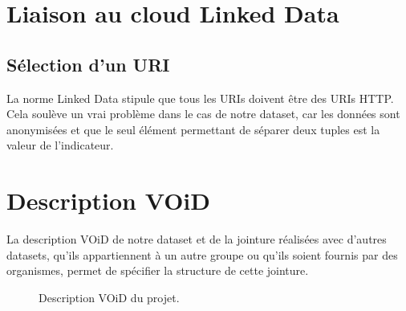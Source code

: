 \chapter{Liaison au cloud Linked Data}
\section{Sélection d'un URI}

La norme Linked Data stipule que tous les URIs doivent être des URIs HTTP. Cela soulève un vrai problème dans le cas de notre dataset, car les données sont anonymisées et que le seul élément permettant de séparer deux tuples est la valeur de l'indicateur.

\chapter{Description VOiD}

La description VOiD de notre dataset et de la jointure réalisées avec d'autres datasets, qu'ils appartiennent à un autre groupe ou qu'ils soient fournis par des organismes, permet de spécifier la structure de cette jointure.

\begin{figure}[H]

\caption{Description VOiD du projet.}
\end{figure}
